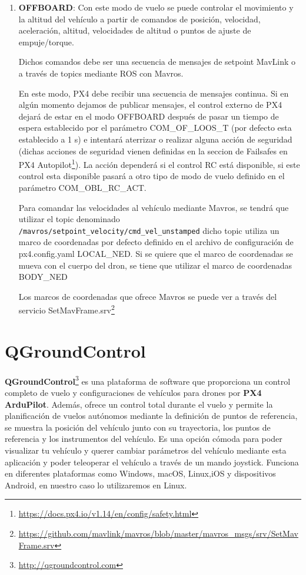 \begin{enumerate}
    \item \textbf{OFFBOARD}: Con este modo de vuelo se puede controlar el movimiento y la altitud del vehículo a partir de comandos de posición, velocidad, aceleración, altitud, velocidades de 
    altitud o puntos de ajuste de empuje/torque. 

    Dichos comandos debe ser una secuencia de mensajes de setpoint MavLink o a través de topics mediante ROS con Mavros.

    En este modo, PX4 debe recibir una secuencia de mensajes continua. Si en algún momento dejamos de publicar mensajes, el control externo de PX4 dejará de estar en el modo OFFBOARD después
    de pasar un tiempo de espera establecido por el parámetro COM\_OF\_LOOS\_T (por defecto esta establecido a 1 s) e intentará aterrizar o realizar alguna acción de seguridad (dichas acciones 
    de seguridad vienen definidas en la seccion de Failsafes en PX4 Autopilot\footnote{\url{https://docs.px4.io/v1.14/en/config/safety.html}}). La acción dependerá
    si el control RC está disponible, si este control esta disponible pasará a otro tipo de modo de vuelo definido en el parámetro COM\_OBL\_RC\_ACT. 

    Para comandar las velocidades al vehículo mediante Mavros, se tendrá que utilizar el topic denominado \texttt{/mavros/setpoint\_velocity/cmd\_vel\_unstamped} dicho topic utiliza un marco de coordenadas
    por defecto definido en el archivo de configuración de px4.config.yaml LOCAL\_NED. Si se quiere que el marco de coordenadas se mueva con el 
    cuerpo del dron, se tiene que utilizar el marco de coordenadas BODY\_NED
  
    Los marcos de coordenadas que ofrece Mavros se puede ver a través del servicio SetMavFrame.srv\footnote{\url{https://github.com/mavlink/mavros/blob/master/mavros_msgs/srv/SetMavFrame.srv}}
  \end{enumerate}
  
\section{QGroundControl}
\label{sec:QGroundControl} 

\textbf{QGroundControl}\footnote{\url{http://qgroundcontrol.com}} es una plataforma de software que proporciona un control completo de vuelo 
y configuraciones de vehículos para drones por \textbf{PX4 ArduPilot}. Además, ofrece un control total durante el vuelo y permite la planificación de vuelos autónomos 
mediante la definición de puntos de referencia, se muestra la posición del vehículo junto con su trayectoria, los puntos de referencia y los instrumentos del vehículo. 
Es una opción cómoda para poder visualizar tu vehículo y querer cambiar parámetros del vehículo mediante esta aplicación y poder teleoperar el vehículo a través de un mando joystick.
Funciona en diferentes plataformas como Windows, macOS, Linux,iOS y dispositivos Android, en nuestro caso lo utilizaremos en Linux. 

